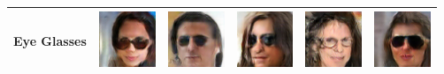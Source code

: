 \begin{table}[ht]
\begin{tabular}{|llllll|}
Eye Glasses  & \includegraphics[width=1.69cm, height=1.69cm]{Files/images/images7/image79.png}  &\includegraphics[width=1.69cm, height=1.69cm]{Files/images/images7/image4.png}   & \includegraphics[width=1.69cm, height=1.69cm]{Files/images/images7/image27.png}  & \includegraphics[width=1.69cm, height=1.69cm]{Files/images/images7/image25.png}  & \includegraphics[width=1.69cm, height=1.69cm]{Files/images/images7/image67.png} \\ \hline


\end{tabular}
\end{table}
